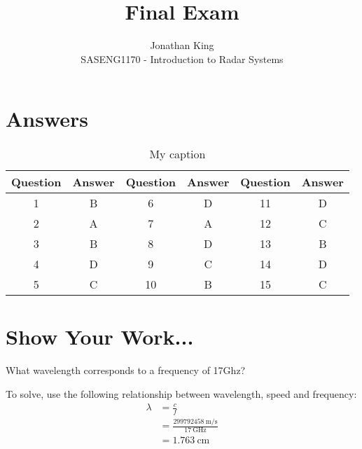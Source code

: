\documentclass[12pt]{article}
\newenvironment{exercise}[2][Exercise]{\begin{trivlist}
    \item[\hskip \labelsep {\bfseries #1}\hskip \labelsep {\bfseries #2.}]}{\end{trivlist}}
\begin{document}
      
       
      
        
	\title{Final Exam} 
	\author{Jonathan King\\ %
	SASENG1170 - Introduction to Radar Systems} %
	 
	 \maketitle

   \section{Answers}
   \begin{table}[h]
     \centering
     \caption{My caption}
     \label{my-label}
     \begin{tabular}{|c|c|c|c|c|c|}
      \hline
      \rowcolor[HTML]{9B9B9B} 
      Question & Answer & Question & Answer & Question & Answer \\ \hline
      1        & B      & 6        & D      & 11       & D      \\ \hline
      2        & A      & 7        & A      & 12       & C      \\ \hline
      3        & B      & 8        & D      & 13       & B      \\ \hline
      4        & D      & 9        & C      & 14       & D      \\ \hline
      5        & C      & 10       & B      & 15       & C      \\ \hline
     \end{tabular}
    \end{table}

    \section{Show Your Work...}

      \begin{exercise}{1}
      What wavelength corresponds to a frequency of 17Ghz?
      
      To solve, use the following relationship between wavelength, speed and frequency:
      \begin{align*}
      \lambda & = \frac{c}{f} \\
      & = \frac{\SI{299792458}{\meter\per\second}}{\SI{17}{\GHz}}\\
      & = \SI{1.763}{\cm}
      \end{align*}
      
      \end{exercise}
      
\end{document}

